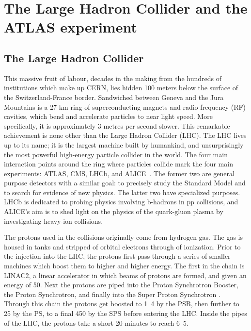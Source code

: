 \chapter{The Large Hadron Collider and the ATLAS experiment}
\label{chap:ATLASdetector}
\section{The Large Hadron Collider}
\label{sec:LHC}

This massive fruit of labour, decades in the making from the hundreds of institutions which make up CERN, lies hidden 100 meters below the surface of the Switzerland-France border. Sandwiched between Geneva and the Jura Mountains is a 27 km ring of superconducting magnets and radio-frequency (RF) cavities, which bend and accelerate particles to near light speed. More specifically, it is approximately 3 metres per second slower. This remarkable achievement is none other than the Large Hadron Collider (LHC). The LHC lives up to its name; it is the largest machine built by humankind, and unsurprisingly the most powerful high-energy particle collider in the world. The four main interaction points around the ring where particles collide mark the four main experiments: ATLAS, CMS, LHCb, and ALICE~\cite{LHCMachine}. The former two are general purpose detectors with a similar goal: to precisely study the Standard Model and to search for evidence of new physics. The latter two have specialized purposes. LHCb is dedicated to probing physics involving b-hadrons in pp collisions, and ALICE’s aim is to shed light on the physics of the quark-gluon plasma by investigating heavy-ion collisions. 

The protons used in the collisions originally come from hydrogen gas. The gas is housed in tanks and stripped of orbital electrons through
of ionization. Prior to the injection into the LHC, the protons first pass through a series of smaller machines which boost them to higher and higher energy. The first in the chain is LINAC2, a linear accelerator in which beams of protons are formed, and given an energy of \unit{50}{\MeV}. Next the protons are piped into the Proton Synchrotron Booster, the Proton Synchrotron, and finally into the Super Proton Synchrotron . Through this chain the protons get boosted to \unit{1.4}{\GeV} by the PSB, then further to \unit{25}{\GeV} by the PS, to a final \unit{450}{\GeV} by the SPS before entering the LHC. Inside the pipes of the LHC, the protons take a short 20 minutes to reach \unit{6.5}{\TeV}. 

